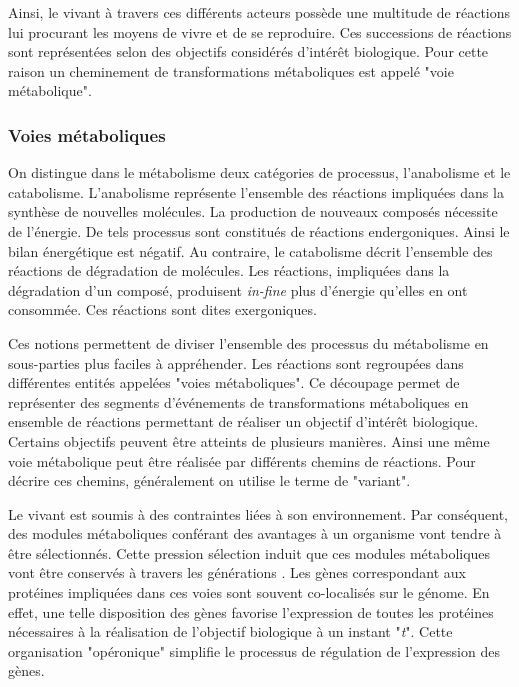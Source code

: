 \begin{refsegment}
    Ainsi, le vivant à travers ces différents acteurs possède une multitude de réactions lui procurant les moyens de vivre et de se reproduire. Ces successions de réactions sont représentées selon des objectifs considérés d'intérêt biologique. Pour cette raison un cheminement de transformations métaboliques est appelé "voie métabolique".
    
    
    \subsubsection{Voies métaboliques}
    On distingue dans le métabolisme deux catégories de processus, l'anabolisme et le catabolisme. L'anabolisme représente l'ensemble des réactions impliquées dans la synthèse de nouvelles molécules. La production de nouveaux composés nécessite de l'énergie. De tels processus sont constitués de réactions endergoniques. Ainsi le bilan énergétique est négatif.  Au contraire, le catabolisme décrit l'ensemble des réactions de dégradation de molécules. Les réactions, impliquées dans la dégradation d'un composé, produisent \textit{in-fine} plus d'énergie qu'elles en ont consommée. Ces réactions sont dites exergoniques.
    
    Ces notions permettent de diviser l'ensemble des processus du métabolisme en sous-parties plus faciles à appréhender. Les réactions sont regroupées dans différentes entités appelées "voies métaboliques". Ce découpage permet de représenter des segments d'événements de transformations métaboliques en ensemble de réactions permettant de réaliser un objectif d'intérêt biologique. Certains objectifs peuvent être atteints de plusieurs manières. Ainsi une même voie métabolique peut être réalisée par différents chemins de réactions. Pour décrire ces chemins, généralement on utilise le terme de "variant".
    
    Le vivant est soumis à des contraintes liées à son environnement. Par conséquent, des modules métaboliques conférant des avantages à un organisme vont tendre à être sélectionnés. Cette pression sélection induit que ces modules métaboliques vont être conservés à travers les générations \cite{braakman2012compositional}. Les gènes correspondant aux protéines impliquées dans ces voies sont souvent co-localisés sur le génome. En effet, une telle disposition des gènes favorise l'expression de toutes les protéines nécessaires à la réalisation de l'objectif biologique à un instant "\textit{t}". Cette organisation "opéronique" simplifie le processus de régulation de l'expression des gènes. 
    

\end{refsegment}

